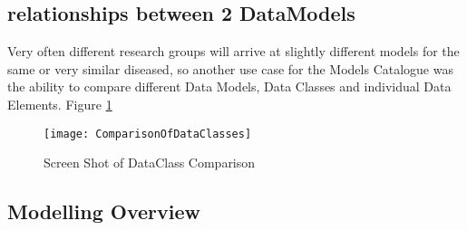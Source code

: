 \subsection{relationships between 2 DataModels}
Very often different research groups will arrive at slightly different models for the same or very similar diseased, so another use case for the Models Catalogue was the ability to compare different Data Models, Data Classes and individual Data Elements. Figure \ref{fig:dataClassComparison}
\begin{figure}[here]
	\texttt{[image: ComparisonOfDataClasses]}
	\caption{Screen Shot of DataClass Comparison} 
	\label{fig:dataClassComparison}	
\end{figure}







\subsection{Modelling Overview}





 
 